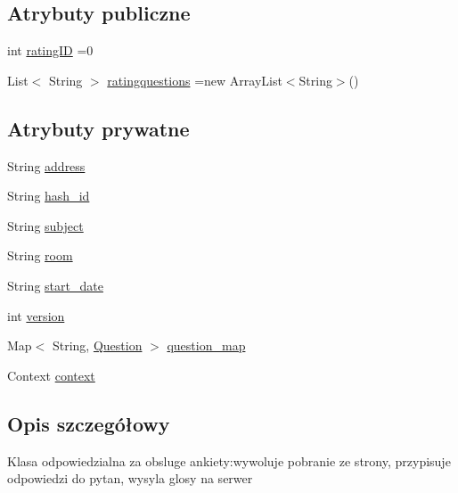\subsection*{Atrybuty publiczne}
\begin{DoxyCompactItemize}
\item 
int \hyperlink{classcom_1_1example_1_1qrpoll_1_1_poll_a41aee71def14cf65836f768222a32ba3}{rating\+I\+D} =0
\item 
List$<$ String $>$ \hyperlink{classcom_1_1example_1_1qrpoll_1_1_poll_a357dc2acb9f42f2bee8dd88556551637}{ratingquestions} =new Array\+List$<$String$>$()
\end{DoxyCompactItemize}
\subsection*{Atrybuty prywatne}
\begin{DoxyCompactItemize}
\item 
String \hyperlink{classcom_1_1example_1_1qrpoll_1_1_poll_a284d664b1db022d0fe8f089c4cad5ead}{address}
\item 
String \hyperlink{classcom_1_1example_1_1qrpoll_1_1_poll_acbb2a9859e39f1b1ce48e75c95eb3866}{hash\+\_\+id}
\item 
String \hyperlink{classcom_1_1example_1_1qrpoll_1_1_poll_ac710a3059ee7152dd6aa5e7bea399726}{subject}
\item 
String \hyperlink{classcom_1_1example_1_1qrpoll_1_1_poll_a73035d1fde89a6b4d69cd4e5ee610b8b}{room}
\item 
String \hyperlink{classcom_1_1example_1_1qrpoll_1_1_poll_a43059ae0d84924af4a6f876f31ee26d4}{start\+\_\+date}
\item 
int \hyperlink{classcom_1_1example_1_1qrpoll_1_1_poll_af8617455744b1f5935c9c4042345782c}{version}
\item 
Map$<$ String, \hyperlink{classcom_1_1example_1_1qrpoll_1_1_question}{Question} $>$ \hyperlink{classcom_1_1example_1_1qrpoll_1_1_poll_ac4019650bac8ecbf279808dc4d4dae9b}{question\+\_\+map}
\item 
Context \hyperlink{classcom_1_1example_1_1qrpoll_1_1_poll_a22159bb6ccaf5330c7691c47fcb0ea00}{context}
\end{DoxyCompactItemize}


\subsection{Opis szczegółowy}
Klasa odpowiedzialna za obsluge ankiety\+:wywoluje pobranie ze strony, przypisuje odpowiedzi do pytan, wysyla glosy na serwer

